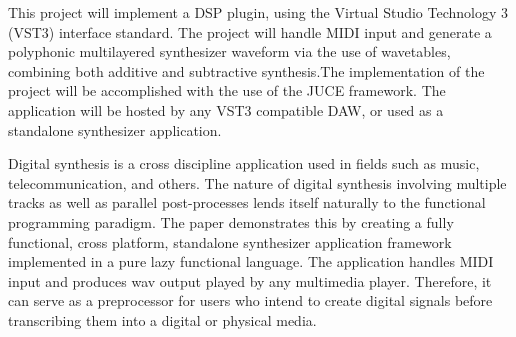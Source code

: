 \documentclass[10pt,a4paper]{altacv}
\begin{document}
\small{
	This project will implement a DSP plugin, using the Virtual Studio Technology 3 (VST3) interface standard. The project will handle MIDI input and generate a polyphonic multilayered synthesizer waveform via the use of wavetables, combining both additive and subtractive synthesis.The implementation of the project will be accomplished with the use of the JUCE framework. The application will be hosted by any VST3 compatible DAW, or used as a standalone synthesizer application.\\
}

\divider

\small{Digital synthesis is a cross discipline application used in fields such as music, telecommunication, and others. The nature of digital synthesis involving multiple tracks as well as parallel post-processes lends itself naturally to the functional programming paradigm. The paper demonstrates this by creating a fully functional, cross platform, standalone synthesizer application framework implemented in a pure lazy functional language. The application handles MIDI input and produces wav output played by any multimedia player. Therefore, it can serve as a preprocessor for users who intend to create digital signals before transcribing them into a digital or physical media.}




\medskip

\clearpage
\end{document}
